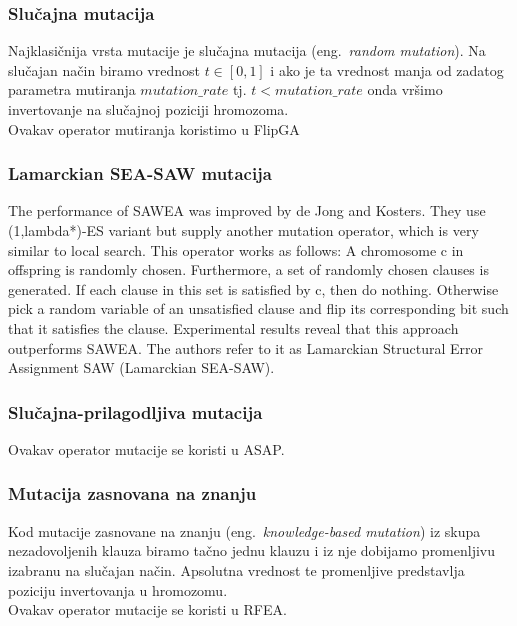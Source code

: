 \documentclass{article}
\begin{document}
\subsubsection{Slučajna mutacija}
\label{sec:ea_slucajna_mutacija}
Najklasičnija vrsta mutacije je slučajna mutacija (eng.~{\em random mutation}). Na slučajan način biramo vrednost $t \in [0,1]$ i ako je ta vrednost manja od zadatog parametra mutiranja $mutation\_rate$ tj. $ t < mutation\_rate$ onda vršimo invertovanje na slučajnoj poziciji hromozoma.\\

Ovakav operator mutiranja koristimo u  FlipGA

\subsubsection{Lamarckian SEA-SAW mutacija}
\label{sec:ea_lamarckian}
The performance of SAWEA was improved by de Jong and Kosters. They use (1,lambda*)-ES variant but supply another mutation operator, which is very similar to local search. This operator works as follows: A chromosome c in offspring is randomly chosen. Furthermore, a set of randomly chosen clauses is generated. If each clause in this set is satisfied by c, then do nothing. Otherwise pick a random variable of an unsatisfied clause and flip its corresponding bit such that it satisfies the clause. Experimental results reveal that this approach outperforms SAWEA. The authors refer to it as Lamarckian Structural Error Assignment SAW (Lamarckian SEA-SAW).

\subsubsection{Slučajna-prilagodljiva mutacija}
\label{sec:ea_slucajna_prilagodljiva_mutacija}

Ovakav operator mutacije se koristi u ASAP.

\subsubsection{Mutacija zasnovana na znanju}
\label{sec:ea_mutacija_znanje}
Kod mutacije zasnovane na znanju (eng.~{\em knowledge-based mutation}) iz skupa nezadovoljenih klauza biramo tačno jednu klauzu i iz nje dobijamo promenljivu izabranu na slučajan način. Apsolutna vrednost te promenljive predstavlja poziciju invertovanja u hromozomu.\\

Ovakav operator mutacije se koristi u RFEA.
\end{document}
